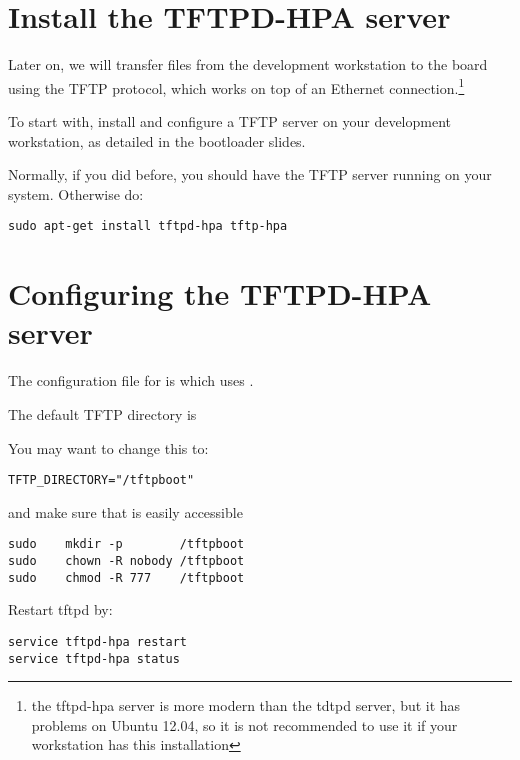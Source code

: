 
\section{Install the TFTPD-HPA server}

Later on, we will transfer files from the development workstation to
the board using the TFTP protocol, which works on top of an Ethernet
connection.\footnote{the tftpd-hpa server is more modern than the
tdtpd server, but it has problems on Ubuntu 12.04, 
so it is not recommended to use it if your workstation has this installation}

To start with, install and configure a TFTP server on your development
workstation, as detailed in the bootloader slides.

Normally, if you did  before, you should have
the TFTP server running on your system. Otherwise do:

\begin{verbatim}
sudo apt-get install tftpd-hpa tftp-hpa
\end{verbatim}

\section{Configuring the TFTPD-HPA server}

The configuration file for  is 
which uses .

The default TFTP directory is 

You may want to change this to:

\begin{verbatim}
TFTP_DIRECTORY="/tftpboot"
\end{verbatim}

and make sure that   is easily accessible

\begin{verbatim}
sudo    mkdir -p        /tftpboot
sudo    chown -R nobody /tftpboot
sudo    chmod -R 777    /tftpboot
\end{verbatim}

Restart tftpd by:

\begin{verbatim}
service tftpd-hpa restart
service tftpd-hpa status
\end{verbatim}

